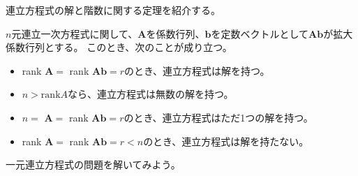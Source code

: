 \documentclass{jlreq}
\begin{document}
連立方程式の解と階数に関する定理を紹介する。

\begin{theorembox}[連立方程式と階数]
  $n$元連立一次方程式に関して、$\boldsymbol{A}$を係数行列、$\boldsymbol{b}$を定数ベクトルとして$\boldsymbol{A} \boldsymbol{b}$が拡大係数行列とする。
  このとき、次のことが成り立つ。
  
  \begin{itemize}
    \item rank $\boldsymbol{A} = $ rank $\boldsymbol{A} \boldsymbol{b} = r$のとき、連立方程式は解を持つ。
    \item $n > \text{rank} A$なら、連立方程式は無数の解を持つ。
    \item $n = $ $\boldsymbol{A} = $ rank $\boldsymbol{A} \boldsymbol{b} = r$のとき、連立方程式はただ1つの解を持つ。
    \item rank $\boldsymbol{A} = $ rank $\boldsymbol{A} \boldsymbol{b} = r < n$のとき、連立方程式は解を持たない。
  \end{itemize}
\end{theorembox}

一元連立方程式の問題を解いてみよう。
\end{document}
